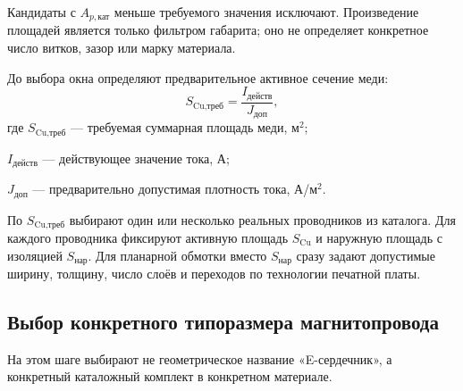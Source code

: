 \documentclass[14pt,a4paper]{extarticle}
\begin{document}
Кандидаты с $A_{p,\text{кат}}$ меньше требуемого значения исключают.
Произведение площадей является только фильтром габарита; оно не
определяет конкретное число витков, зазор или марку материала.

До выбора окна определяют предварительное активное сечение меди:
\begin{equation}
 S_{\text{Cu,треб}}=
 \frac{I_{\text{действ}}}{J_{\text{доп}}},
 \label{eq:copper-area}
\end{equation}
где $S_{\text{Cu,треб}}$ --- требуемая суммарная площадь меди, м$^2$;\par\noindent
$I_{\text{действ}}$ --- действующее значение тока, А;\par\noindent
$J_{\text{доп}}$ --- предварительно допустимая плотность тока, А/м$^2$.

По $S_{\text{Cu,треб}}$ выбирают один или несколько реальных проводников
из каталога. Для каждого проводника фиксируют активную площадь
$S_{\text{Cu}}$ и наружную площадь с изоляцией $S_{\text{нар}}$.
Для планарной обмотки вместо $S_{\text{нар}}$ сразу задают допустимые
ширину, толщину, число слоёв и переходов по технологии печатной платы.

\subsection{Выбор конкретного типоразмера магнитопровода}
\label{subsec:core-size-choice}

На этом шаге выбирают не геометрическое название «E-сердечник», а
конкретный каталожный комплект в конкретном материале.
\end{document}

